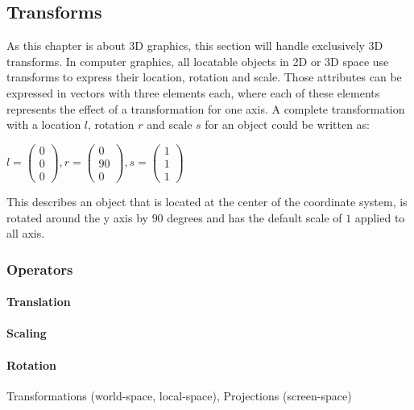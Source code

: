 \subsection{Transforms}
As this chapter is about 3D graphics, this section will handle exclusively 3D transforms. In computer graphics, all locatable objects in 2D or 3D space use transforms to express their location, rotation and scale. Those attributes can be expressed in vectors with three elements each, where each of these elements represents the effect of a transformation for one axis. A complete transformation with a location $l$, rotation $r$ and scale $s$ for an object could be written as:
\begin{center}$l = \begin{pmatrix} 0\\0\\0\end{pmatrix}, r = \begin{pmatrix} 0\\90\\0\end{pmatrix},  s = \begin{pmatrix} 1\\1\\1\end{pmatrix}$\end{center}
This describes an object that is located at the center of the coordinate system, is rotated around the y axis by $90$ degrees and has the default scale of $1$ applied to all axis.
\cite{10.1007/978-1-4471-6290-2}
\subsubsection{Operators}
\paragraph{Translation}
\paragraph{Scaling}
\paragraph{Rotation}


Transformations (world-space, local-space), Projections (screen-space)

